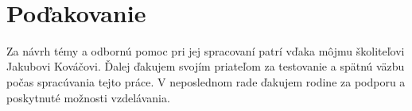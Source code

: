 ~\vfill
\section*{Poďakovanie}

Za návrh témy a odbornú pomoc pri jej spracovaní patrí vďaka môjmu školiteľovi Jakubovi Kováčovi. Ďalej ďakujem svojím priateľom za testovanie a spätnú väzbu počas spracúvania tejto práce. V neposlednom rade ďakujem rodine za podporu a poskytnuté možnosti vzdelávania.

\vspace{3cm}
